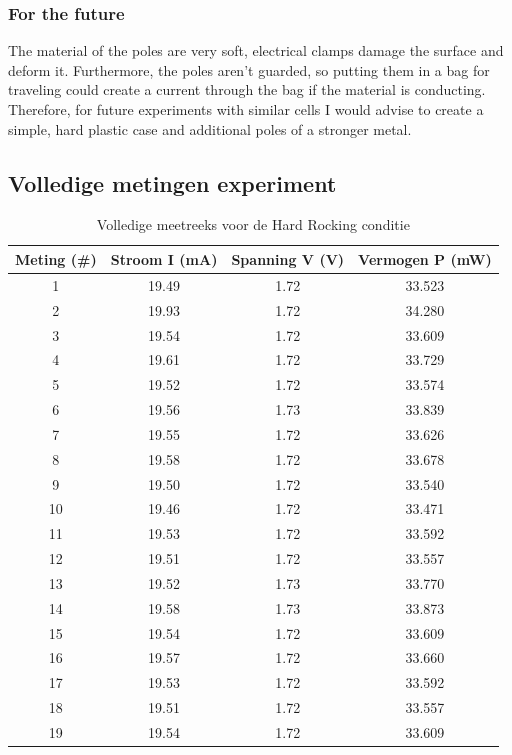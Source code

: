 \subsubsection{\textbf{For the future}}
The material of the poles are very soft, electrical clamps damage the surface and deform it. Furthermore, the poles aren't guarded, so putting them in a bag for traveling could create a current through the bag if the material is conducting. Therefore, for future experiments with similar cells I would advise to create a simple, hard plastic case and additional poles of a stronger metal.


\subsection{Volledige metingen experiment}
\begin{table}[htbp]
\centering
\caption{Volledige meetreeks voor de Hard Rocking conditie}
\label{tab:hard_rocking_data}
\begin{tabular}{c S[table-format=2.2] S[table-format=1.2] S[table-format=2.3]}
\toprule
\textbf{Meting (\#)} & {\textbf{Stroom I (mA)}} & {\textbf{Spanning V (V)}} & {\textbf{Vermogen P (mW)}} \\
  & 19.49 & 1.72 & 33.523 \\
2  & 19.93 & 1.72 & 34.280 \\
3  & 19.54 & 1.72 & 33.609 \\
4  & 19.61 & 1.72 & 33.729 \\
5  & 19.52 & 1.72 & 33.574 \\
6  & 19.56 & 1.73 & 33.839 \\
7  & 19.55 & 1.72 & 33.626 \\
8  & 19.58 & 1.72 & 33.678 \\
9  & 19.50 & 1.72 & 33.540 \\
10 & 19.46 & 1.72 & 33.471 \\
11 & 19.53 & 1.72 & 33.592 \\
12 & 19.51 & 1.72 & 33.557 \\
13 & 19.52 & 1.73 & 33.770 \\
14 & 19.58 & 1.73 & 33.873 \\
15 & 19.54 & 1.72 & 33.609 \\
16 & 19.57 & 1.72 & 33.660 \\
17 & 19.53 & 1.72 & 33.592 \\
18 & 19.51 & 1.72 & 33.557 \\
19 & 19.54 & 1.72 & 33.609 \\

\end{tabular}
\end{table}
